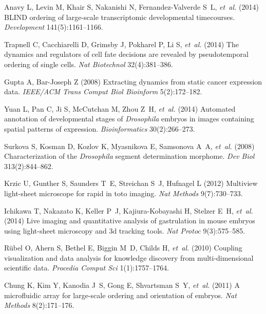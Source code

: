 \documentclass{pnastwo}
\begin{document}
\begin{article}
\begin{thebibliography}{10}
Anavy L, Levin M, Khair S, Nakanishi N, Fernandez-Valverde S~L, \textit{et~al.}
  (2014) {BLIND} ordering of large-scale transcriptomic developmental
  timecourses. \textit{Development} 141(5):1161--1166.

Trapnell C, Cacchiarelli D, Grimsby J, Pokharel P, Li S, \textit{et~al.} (2014)
  The dynamics and regulators of cell fate decisions are revealed by
  pseudotemporal ordering of single cells. \textit{Nat Biotechnol}
  32(4):381--386.

Gupta A, Bar-Joseph Z (2008) Extracting dynamics from static cancer expression
  data. \textit{IEEE/ACM Trans Comput Biol Bioinform} 5(2):172--182.

Yuan L, Pan C, Ji S, McCutchan M, Zhou Z~H, \textit{et~al.} (2014) Automated
  annotation of developmental stages of \textit{{D}rosophila} embryos in images
  containing spatial patterns of expression. \textit{Bioinformatics}
  30(2):266--273.

Surkova S, Kosman D, Kozlov K, Myasnikova E, Samsonova A~A, \textit{et~al.}
  (2008) Characterization of the \textit{{D}rosophila} segment determination
  morphome. \textit{Dev Biol} 313(2):844--862.

Krzic U, Gunther S, Saunders T~E, Streichan S~J, Hufnagel L (2012) Multiview
  light-sheet microscope for rapid in toto imaging. \textit{Nat Methods}
  9(7):730--733.

Ichikawa T, Nakazato K, Keller P~J, Kajiura-Kobayashi H, Stelzer E~H,
  \textit{et~al.} (2014) Live imaging and quantitative analysis of gastrulation
  in mouse embryos using light-sheet microscopy and 3d tracking tools.
  \textit{Nat Protoc} 9(3):575--585.

R{\"u}bel O, Ahern S, Bethel E, Biggin M~D, Childs H, \textit{et~al.} (2010)
  Coupling visualization and data analysis for knowledge discovery from
  multi-dimensional scientific data. \textit{Procedia Comput Sci}
  1(1):1757--1764.

Chung K, Kim Y, Kanodia J~S, Gong E, Shvartsman S~Y, \textit{et~al.} (2011) A
  microfluidic array for large-scale ordering and orientation of embryos.
  \textit{Nat Methods} 8(2):171--176.

\end{thebibliography}

\end{article}
\end{document}
